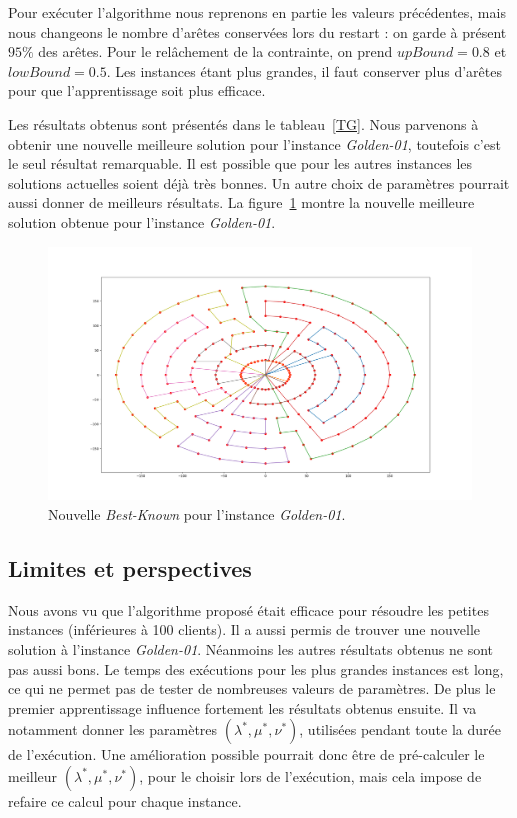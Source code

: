 \documentclass[a4paper,11pt]{article}%
\begin{document}
Pour exécuter l'algorithme nous reprenons en partie les valeurs précédentes, mais nous changeons le nombre d'arêtes conservées lors du restart : on garde à présent $95\%$ des arêtes. Pour le relâchement de la contrainte, on prend $upBound = 0.8$ et $lowBound = 0.5$. Les instances étant plus grandes, il faut conserver plus d'arêtes pour que l'apprentissage soit plus efficace.

Les résultats obtenus sont présentés dans le tableau~\ref{TG}. Nous parvenons à obtenir une nouvelle meilleure solution pour l'instance \emph{Golden-01}, toutefois c'est le seul résultat remarquable. Il est possible que pour les autres instances les solutions actuelles soient déjà très bonnes. Un autre choix de paramètres pourrait aussi donner de meilleurs résultats. La figure~\ref{NewBest} montre la nouvelle meilleure solution obtenue pour l'instance \emph{Golden-01}. 

\begin{figure}[p]
\begin{center}

\includegraphics[scale=0.32]{NewBest5499}
\caption{Nouvelle \emph{Best-Known} pour l'instance \emph{Golden-01}.}

\label{NewBest}


\end{center}
\end{figure}

\subsection{Limites et perspectives}

Nous avons vu que l'algorithme proposé était efficace pour résoudre les petites instances (inférieures à 100 clients). 
Il a aussi permis de trouver une nouvelle solution à l'instance \emph{Golden-01}. 
Néanmoins les autres résultats obtenus ne sont pas aussi bons. 
Le temps des exécutions pour les plus grandes instances est long, ce qui ne permet pas de tester de nombreuses valeurs de paramètres.
De plus le premier apprentissage influence fortement les résultats obtenus ensuite. Il va notamment donner les paramètres $(\lambda^*,\mu^*,\nu^*)$, utilisées pendant toute la durée de l'exécution. Une amélioration possible pourrait donc être de pré-calculer le meilleur  
$(\lambda^*,\mu^*,\nu^*)$, pour le choisir lors de l'exécution, mais cela impose de refaire ce calcul pour chaque instance.
\end{document}
